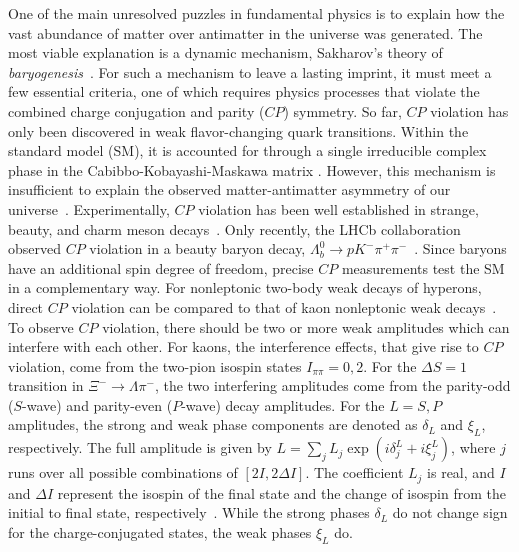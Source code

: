 \documentclass[aps,amsmath,amssymb,reprint]{revtex4-2}
\newcommand{\xim}{\Xi^{-}}
\begin{document}
One of the main unresolved puzzles in fundamental physics is to explain how the vast abundance of matter over antimatter in the universe was generated. The most viable explanation is a dynamic mechanism, Sakharov’s theory of \textit{baryogenesis}~\cite{Sakharov:1967dj}. For such a mechanism to leave a lasting imprint, it must meet a few essential criteria, one of which requires physics processes that violate the combined charge conjugation and parity ($CP$) symmetry. So far, $CP$ violation has only been discovered in weak flavor-changing quark transitions.  Within the standard model (SM), it is accounted for through a single irreducible complex phase in the Cabibbo-Kobayashi-Maskawa matrix \cite{Cabibbo:1963yz, Kobayashi:1973fv}. However, this mechanism is insufficient to explain the observed matter-antimatter asymmetry of our universe~\cite{Bernreuther:2002uj, Canetti:2012zc}. Experimentally, $CP$ violation has been well established in strange, beauty, and charm meson decays~\cite{Christenson:1964fg, Aubert:2001nu, Abe:2001xe, Aaij:2019kcg}. Only recently, the LHCb collaboration observed $CP$ violation in a beauty baryon decay, $\Lambda_b^0\to pK^-\pi^+\pi^-$~\cite{LHCb:2025ray}.
Since baryons have an additional spin degree of freedom, precise $CP$ measurements test the SM in a complementary way. For nonleptonic two-body weak decays of hyperons, direct $CP$ violation can be compared to that of kaon nonleptonic weak decays~\cite{Tandean:2003fr, Salone:2022lpt}. To observe $CP$ violation, there should be two or more weak amplitudes which can interfere with each other.
For kaons, the interference effects, that give rise to $CP$ violation, come from the two-pion isospin states $I_{\pi\pi}=0, 2$. For the $\Delta S=1$ transition in $\xim \to \Lambda \pi^-$,
the two interfering amplitudes come from the parity-odd ($S$-wave) and parity-even ($P$-wave) decay amplitudes.
For the $L=S, P$ amplitudes, the strong and weak phase components are denoted as $\delta_L$ and $\xi_L$, respectively. The full amplitude is given by $L= \sum_{j} L_j \exp (i\delta_{j}^L + i\xi_{j}^L)$, where $j$ runs over all possible combinations of $[2I,2\Delta I]$. The coefficient $L_j$ is real, and $I$ and $\Delta I$ represent the isospin of the final state and the change of isospin from the initial to final state, respectively~\cite{Salone:2022lpt, Donoghue:1986hh}. While the strong phases $\delta_L$ do not change sign for the charge-conjugated states, the weak phases $\xi_L$ do.
\end{document}
